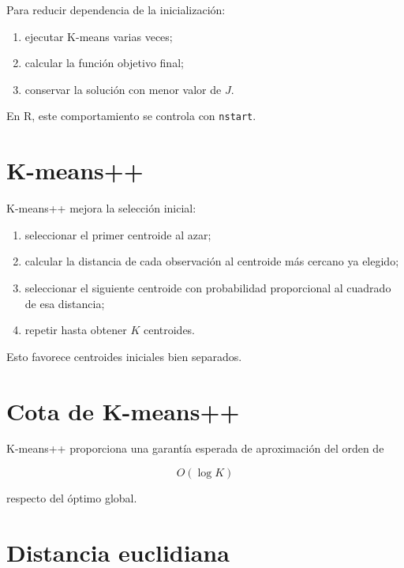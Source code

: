 \documentclass[
  spanish,
  10.5pt,
  letterpaper,
  DIV=11,
  numbers=noendperiod,
  oneside,
  open=any]{scrreprt}
\providecommand{\tightlist}{%
  \setlength{\itemsep}{0pt}\setlength{\parskip}{0pt}}
\theoremstyle{definition}
\theoremstyle{definition}
\theoremstyle{plain}
\theoremstyle{remark}
\begin{document}

Para reducir dependencia de la inicialización:

\begin{enumerate}
\def\labelenumi{\arabic{enumi}.}
\tightlist
\item
  ejecutar K-means varias veces;
\item
  calcular la función objetivo final;
\item
  conservar la solución con menor valor de \(J\).
\end{enumerate}

En R, este comportamiento se controla con \texttt{nstart}.

\section*{K-means++}\label{k-means}


K-means++ mejora la selección inicial:

\begin{enumerate}
\def\labelenumi{\arabic{enumi}.}
\tightlist
\item
  seleccionar el primer centroide al azar;
\item
  calcular la distancia de cada observación al centroide más cercano ya
  elegido;
\item
  seleccionar el siguiente centroide con probabilidad proporcional al
  cuadrado de esa distancia;
\item
  repetir hasta obtener \(K\) centroides.
\end{enumerate}

Esto favorece centroides iniciales bien separados.

\section*{Cota de K-means++}\label{cota-de-k-means}


K-means++ proporciona una garantía esperada de aproximación del orden de

\[
O(\log K)
\]

respecto del óptimo global.

\section*{Distancia euclidiana}\label{distancia-euclidiana-2}
\end{document}
